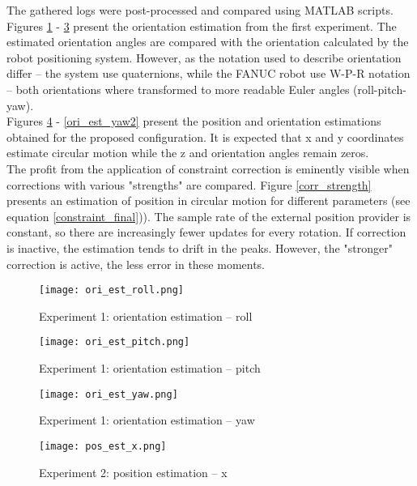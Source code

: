 The gathered logs were post-processed and compared using MATLAB scripts. Figures \ref{ori_est_roll} - \ref{ori_est_yaw} present the orientation estimation from the first experiment. The estimated orientation angles are compared with the orientation calculated by the robot positioning system. However, as the notation used to describe orientation differ -- the system use quaternions, while the FANUC robot use W-P-R notation -- both orientations where transformed to more readable Euler angles (roll-pitch-yaw).  \\

Figures \ref{pos_est_x} - \ref{ori_est_yaw2} present the position and orientation estimations obtained for the proposed configuration. It is expected that x and y coordinates estimate circular motion while the z and orientation angles remain zeros.\\

The profit from the application of constraint correction is eminently visible when corrections with various "strengths" are compared. Figure \ref{corr_strength} presents an estimation of position in circular motion for different parameters (see equation \ref{constraint_final})). The sample rate of the external position provider is constant, so there are increasingly fewer updates for every rotation. If correction is inactive, the estimation tends to drift in the peaks. However, the "stronger" correction is active, the less error in these moments.

\begin{figure}[p]
	\centering
	\texttt{[image: ori\_est\_roll.png]}
	\caption{Experiment 1: orientation estimation -- roll}
	\label{ori_est_roll}
\end{figure}

\begin{figure}[p]
	\centering
	\texttt{[image: ori\_est\_pitch.png]}
	\caption{Experiment 1: orientation estimation -- pitch}
	\label{ori_est_pitch}
\end{figure}


\begin{figure}[p]
	\centering
	\texttt{[image: ori\_est\_yaw.png]}
	\caption{Experiment 1: orientation estimation -- yaw}
	\label{ori_est_yaw}
\end{figure}

\begin{figure}[p]
	\centering
	\texttt{[image: pos\_est\_x.png]}
	\caption{Experiment 2: position estimation -- x}
	\label{pos_est_x}
\end{figure}

